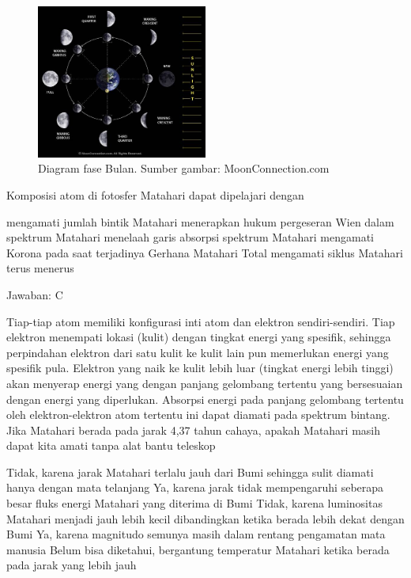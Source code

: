\documentclass[11pt,fleqn]{exam}
\begin{document}
\begin{questions}
\begin{figure}[H]
\centering
\includegraphics[width=0.5\textwidth]{moon_phases.jpg}
\caption{Diagram fase Bulan. Sumber gambar: MoonConnection.com}
\label{overflow}
\end{figure}


\question Komposisi atom di fotosfer Matahari dapat dipelajari dengan
\begin{choices}
\choice mengamati jumlah bintik Matahari
\choice menerapkan hukum pergeseran Wien dalam spektrum Matahari
\choice menelaah garis absorpsi spektrum Matahari
\choice mengamati Korona pada saat terjadinya Gerhana Matahari Total
\choice mengamati siklus Matahari terus menerus
\end{choices}

Jawaban: C

Tiap-tiap atom memiliki konfigurasi inti atom dan elektron sendiri-sendiri. Tiap elektron menempati lokasi (kulit) dengan tingkat energi yang spesifik, sehingga perpindahan elektron dari satu kulit ke kulit lain pun memerlukan energi yang spesifik pula. Elektron yang naik ke kulit lebih luar (tingkat energi lebih tinggi) akan menyerap energi yang dengan panjang gelombang tertentu yang bersesuaian dengan energi yang diperlukan. Absorpsi energi pada panjang gelombang tertentu oleh elektron-elektron atom tertentu ini dapat diamati pada spektrum bintang.\\


\question Jika Matahari berada pada jarak 4,37 tahun cahaya, apakah Matahari masih dapat kita amati tanpa alat bantu teleskop
\begin{choices}
\choice Tidak, karena jarak Matahari terlalu jauh dari Bumi sehingga sulit diamati hanya dengan mata telanjang
\choice Ya, karena jarak tidak mempengaruhi seberapa besar fluks energi Matahari yang diterima di Bumi
\choice Tidak, karena luminositas Matahari menjadi jauh lebih kecil dibandingkan ketika berada lebih dekat dengan Bumi
\choice Ya, karena magnitudo semunya masih dalam rentang pengamatan mata manusia
\choice Belum bisa diketahui, bergantung temperatur Matahari ketika berada pada jarak yang lebih jauh
\end{choices}


\end{questions}
\end{document}
